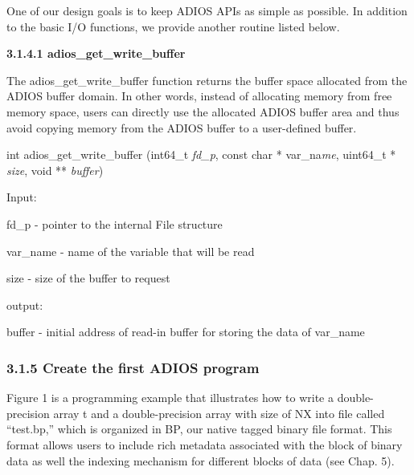 \vspace{10pt}
One of our design goals is to keep ADIOS APIs as simple as possible. In addition 
to the basic I/O functions, we provide another routine listed below. 

\vspace{10pt}
\textbf{3.1.4.1 adios\_get\_write\_buffer}

\vspace{10pt}
The adios\_get\_write\_buffer function returns the buffer space allocated from 
the ADIOS buffer domain. In other words, instead of allocating memory from free 
memory space, users can directly use the allocated ADIOS buffer area and thus avoid 
copying memory from the ADIOS buffer to a user-defined buffer.

\vspace{10pt}
\leftskip=22pt
int adios\_get\_write\_buffer (int64\_t \textit{fd\_p}, const char * var\_na\textit{me}, 
uint64\_t * \textit{size}, void ** \textit{buffer})

\vspace{10pt}
Input: 

\vspace{10pt}
\parindent=21pt
fd\_p - pointer to the internal File structure

\vspace{10pt}
\parindent=0pt
var\_name - name of the variable that will be read

\vspace{10pt}
\parindent=21pt
size - size of the buffer to request

\vspace{10pt}
\parindent=0pt
output: 

\vspace{10pt}
\parindent=21pt
buffer - initial address of read-in buffer for storing the data of var\_name\label{HToc84890239}\label{HToc212016615}\label{HToc212016857}\label{HToc182553353}

\vspace{10pt}
\subsubsection*{{\large \textbf{3.1.5 Create the first ADIOS program}}}

\vspace{10pt}
\leftskip=0pt
\parindent=0pt
Figure 1 is a programming example that illustrates how to write a double-precision 
array t and a double-precision array with size of NX into file called ``test.bp,'' 
which is organized in BP, our native tagged binary file format. This format allows 
users to include rich metadata associated with the block of binary data as well 
the indexing mechanism for different blocks of data (see Chap. 5). 


